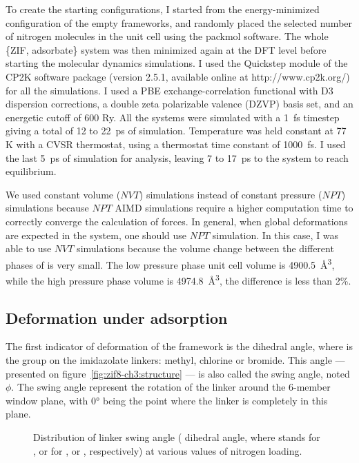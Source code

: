 \documentclass[thesis]{subfiles}
\begin{document}
To create the starting configurations, I started from the energy-minimized
configuration of the empty frameworks, and randomly placed the selected number
of nitrogen molecules in the unit cell using the packmol
software\cite{Martnez2009}. The whole \{ZIF, adsorbate\} system was then
minimized again at the DFT level before starting the molecular dynamics
simulations. I used the Quickstep module\cite{VandeVondele2005} of the CP2K
software package (version 2.5.1, available online at http://www.cp2k.org/) for
all the simulations. I used a PBE exchange-correlation functional with D3
dispersion corrections, a double zeta polarizable valence (DZVP) basis set, and
an energetic cutoff of 600 Ry. All the systems were simulated with a \SI{1}{fs}
timestep giving a total of 12 to \SI{22}{ps} of simulation. Temperature was held
constant at 77 K with a CVSR thermostat, using a thermostat time constant of
\SI{1000}{fs}. I used the last \SI{5}{ps} of simulation for analysis, leaving 7
to \SI{17}{ps} to the system to reach equilibrium.

We used constant volume ($NVT$) simulations instead of constant pressure ($NPT$)
simulations because $NPT$ AIMD simulations require a higher computation time to
correctly converge the calculation of forces. In general, when global
deformations are expected in the system, one should use $NPT$ simulation. In
this case, I was able to use $NVT$ simulations because the volume change between
the different phases of  is very small. The low pressure phase unit cell
volume is \SI{4900.5}{\AA^3}, while the high pressure phase volume is
\SI{4974.8}{\AA^3}, the difference is less than 2\%.

\subsection{Deformation under adsorption}
\label{sec:zif8x:swing}

The first indicator of deformation of the framework is the 
dihedral angle, where  is the group on the imidazolate linkers: methyl,
chlorine or bromide. This angle --- presented on
figure~\ref{fig:zif8-ch3:structure} --- is also called the swing angle, noted
$\phi$. The swing angle represent the rotation of the linker around the 6-member
window plane, with 0° being the point where the linker is completely in this
plane.

\begin{figure}[ht]
    \centering
    
    \caption{Distribution of linker swing angle ( dihedral angle,
    where  stands for ,  or  for , \ZIFCl or
    \ZIFBr, respectively) at various values of nitrogen loading.}
    \label{fig:zif8x:dihedrals}
\end{figure}
\end{document}
